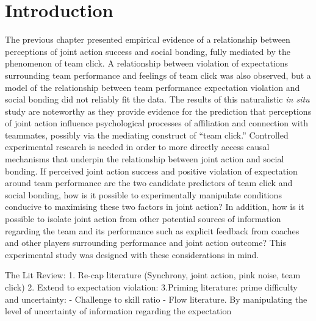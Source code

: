 %


\section{Introduction}

The previous chapter presented empirical evidence of a relationship between perceptions of joint action success and social bonding, fully mediated by the phenomenon of team click.  A relationship between violation of expectations surrounding team performance and feelings of team click was also observed, but a model of the relationship between team performance expectation violation and social bonding did not reliably fit the data.  The results of this naturalistic \textit{in situ} study are noteworthy as they provide evidence for the prediction that perceptions of joint action influence psychological processes of affiliation and connection with teammates, possibly via the mediating construct of ``team click.''  Controlled experimental research is needed in order to more directly access causal mechanisms that underpin the relationship between joint action and social bonding.  If perceived joint action success and positive violation of expectation around team performance are the two candidate predictors of team click and social bonding, how is it possible to experimentally manipulate conditions conducive to maximising these two factors in joint action? In addition, how is it possible to isolate joint action from other potential sources of information regarding the team and its performance such as explicit feedback from coaches and other players surrounding performance and joint action outcome? This experimental study was designed with these considerations in mind.

The Lit Review:
1. Re-cap literature (Synchrony, joint action, pink noise, team click)
2. Extend to expectation violation:
3.Priming literature: prime difficulty and uncertainty:
- Challenge to skill ratio - Flow literature.
By manipulating the level of uncertainty of information regarding the expectation



